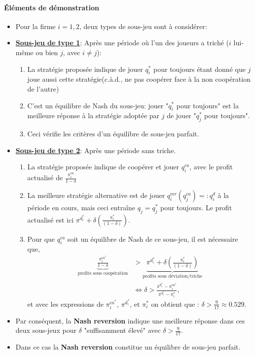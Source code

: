 \documentclass[notes, ignorenonframetext, compress, 9pt, xcolor=svgnames, aspectratio=169]{beamer}
\begin{document}
\begin{frame}[allowframebreaks]{\insertsection}
\framesubtitle{Éléments de démonstration}
\begin{itemize}
    \item Pour la firme $i=1, 2$, deux types de sous-jeu sont à considérer:
    \item \textbf{\underline{Sous-jeu de type 1}}:
    Après une période où l'un des joueurs a triché ($i$ lui-même ou bien $j$, avec $i\neq j$):
    \begin{enumerate}[-]
        \item La stratégie proposée indique de jouer $q_i^*$ pour toujours étant donné que $j$ joue aussi 
        cette stratégie(c.à.d., ne pas coopérer face à la non coopération de  l'autre)
        \item C'est un équilibre de Nash du sous-jeu: jouer "$q_i^*$ pour toujours" est la meilleure 
        réponse à la stratégie adoptée par $j$ de jouer "$q_j^*$ pour toujours".
        \item Ceci vérifie les critères d'un équilibre de sous-jeu parfait.
    \end{enumerate}
    \framebreak
    \item \textbf{\underline{Sous-jeu de type 2}}: Après une période sans triche.
    \begin{enumerate}[-]
        \item La stratégie proposée indique de coopérer et jouer $q_i^{ca}$, avec le profit actualisé de $\frac{\pi_i^{ca}}{1-\delta}$
        \item La meilleure stratégie alternative est de jouer $q_i^{mr}(q_j^{ca}) =: q_i^d$ à la période en cours,
         mais ceci entraîne $q_j =  q_j^*$ pour toujours. Le profit actualisé est ici 
          $\pi^{d^*_i}  + \delta\left(\frac{\pi_i^*}{(1-\delta)}\right)$.
         \item Pour que $q_i^{ca}$ soit un équilibre de Nash de ce sous-jeu, il est nécessaire que,
         \begin{align}
            \underbrace{\frac{\pi_i^{ca^*}}{1-\delta}}_{\text{profits sous coopération}} &> \underbrace{\pi^{d^*_i} + \delta\left(\frac{\pi_i^*}{(1-\delta)}\right)}_{\text{profits sous déviation/triche}}\nonumber\\
            &\Leftrightarrow \delta > \frac{\pi^{d^*_i} - \pi_i^{ca^*} }{\pi^{d^*_i}  - \pi_i^*},
            \label{eq8}
            \end{align}
         et avec les expressions de $\pi_i^{ca^*}$, $\pi^{d^*_i} $, et $\pi_i^*$   on obtient que : $\delta > \frac{9}{17}\approx 0.529$.
    \end{enumerate}
    \item Par conséquent, la \textbf{Nash reversion} indique une meilleure réponse dans ces deux sous-jeux 
 pour $\delta$ "suffisamment élevé" avec $\delta >\frac{9}{17}$. 
    \item Dans ce cas la \textbf{Nash reversion} constitue un équilibre de sous-jeu parfait.
\end{itemize}
\end{frame}
\end{document}
